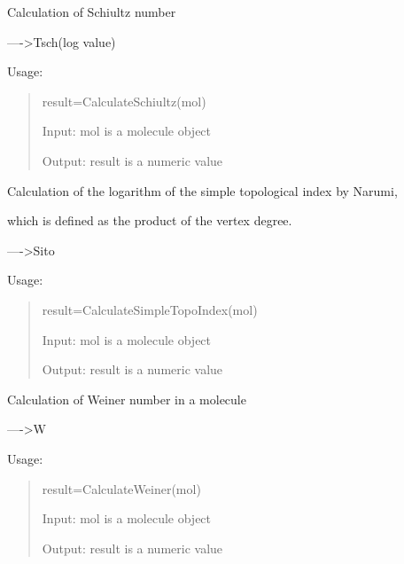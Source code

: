\documentclass[letterpaper,10pt,english]{sphinxmanual}
\begin{document}

\begin{fulllineitems}
\label{reference/topology:topology.CalculateSchiultz}
Calculation of Schiultz number

----\textgreater{}Tsch(log value)

Usage:
\begin{quote}

result=CalculateSchiultz(mol)

Input: mol is a molecule object

Output: result is a numeric value
\end{quote}

\end{fulllineitems}


\begin{fulllineitems}
\label{reference/topology:topology.CalculateSimpleTopoIndex}
Calculation of the logarithm of the simple topological index by Narumi,

which is defined as the product of the vertex degree.

----\textgreater{}Sito

Usage:
\begin{quote}

result=CalculateSimpleTopoIndex(mol)

Input: mol is a molecule object

Output: result is a numeric value
\end{quote}

\end{fulllineitems}


\begin{fulllineitems}
\label{reference/topology:topology.CalculateWeiner}
Calculation of Weiner number in a molecule

----\textgreater{}W

Usage:
\begin{quote}

result=CalculateWeiner(mol)

Input: mol is a molecule object

Output: result is a numeric value
\end{quote}

\end{fulllineitems}
\end{document}
